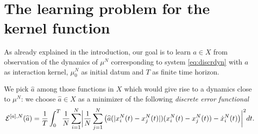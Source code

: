 
\section{The learning problem for the kernel function}\label{sec:learn}

As already explained in the introduction, our goal is to learn $a \in X$ from observation of the dynamics of $\mu^N$ corresponding to system \eqref{eq:discrdyn} with $a$ as interaction kernel, $\mu_0^N$ as initial datum and $T$ as finite time horizon.

We pick $\widehat a$ among those functions in $X$ which would give rise to a dynamics close to $\mu^N$: we choose $\widehat a \in X$ as a minimizer of the following \textit{discrete error functional}
\begin{align}\label{eq-def-error}
	\begin{split}
	\mathcal E^{[a],N}(\widehat a) = \frac{1}{T}\int_0^T\frac{1}{N}\sum_{i=1}^N\biggl|\frac{1}{N}\sum_{j=1}^N
			\left(\widehat a(|x^N_i(t)-x^N_j(t)|)(x^N_i(t) - x^N_j(t))-\dot{x}^N_i(t)\right)\biggr|^2 dt.
	\end{split}
\end{align}

